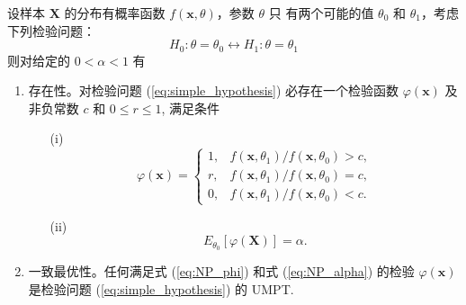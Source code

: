 \begin{lemma}\label{lem:NP}
    设样本 $\mathbf{X}$ 的分布有概率函数 $f(\mathbf{x}, \theta)$，参数 $\theta$ 只
有两个可能的值 $\theta_0$ 和 $\theta_1$，考虑下列检验问题：
\begin{equation}
H_0: \theta = \theta_0 \leftrightarrow H_1: \theta = \theta_1\label{eq:simple_hypothesis}
\end{equation}
则对给定的 $0 < \alpha < 1$ 有
\begin{enumerate}
    \item 存在性。对检验问题 (\ref{eq:simple_hypothesis}) 必存在一个检验函数 $\varphi(\mathbf{x})$ 及非负常数 $c$ 和
    $0 \le r \le 1$, 满足条件
    \begin{enumerate}
        \item[(i)]
        \begin{equation}
        \varphi(\mathbf{x}) = \begin{cases}
        1, & f(\mathbf{x}, \theta_1)/f(\mathbf{x}, \theta_0) > c, \\
        r, & f(\mathbf{x}, \theta_1)/f(\mathbf{x}, \theta_0) = c, \\
        0, & f(\mathbf{x}, \theta_1)/f(\mathbf{x}, \theta_0) < c.
        \end{cases} \label{eq:NP_phi}
        \end{equation}
        \item[(ii)]
        \begin{equation}
        E_{\theta_0}[\varphi(\mathbf{X})] = \alpha. \label{eq:NP_alpha}
        \end{equation}
    \end{enumerate}
    \item 一致最优性。任何满足式 (\ref{eq:NP_phi}) 和式 (\ref{eq:NP_alpha}) 的检验 $\varphi(\mathbf{x})$ 是检验问题
    (\ref{eq:simple_hypothesis}) 的 UMPT.
\end{enumerate}
\end{lemma}
